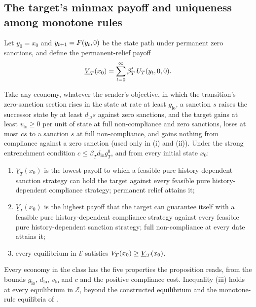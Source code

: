 \subsection{The target's minmax payoff and uniqueness among monotone rules}
\label{sec:moved-main-2026-10-13:security}

 Let $y_0=x_0$ and
$y_{t+1}=F(y_t,0)$ be the state path under permanent zero sanctions, and define
the permanent-relief payoff
\begin{equation}
\underline{V}_T(x_0)=\sum_{t=0}^{\infty}\beta_T^t\,U_T(y_t,0,0).
\label{eq:relief-benchmark}
\end{equation}

\begin{proposition}
\label{prop:security}
Take any economy, whatever the sender's objective, in which the transition's
zero-sanction section rises in the state at rate at least $g_{\mathrm{lo}}$, a
sanction $s$ raises the successor state by at least $d_{\mathrm{lo}}s$ against
zero sanctions, and the target gains at least $v_{\mathrm{lo}}\ge0$ per unit of
state at full non-compliance and zero sanctions, loses at most $cs$ to a sanction $s$
at full non-compliance, and gains nothing from compliance against a zero sanction
(used only in (i) and (ii)). Under the strong entrenchment condition
$c\le\beta_Td_{\mathrm{lo}}g_T^0$, and from every initial state $x_0$:
\begin{enumerate}[label=(\roman*)]
\item $\underline{V}_T(x_0)$ is the lowest payoff to which a feasible pure
history-dependent sanction strategy can hold the target against every
feasible pure history-dependent compliance strategy; permanent relief attains it;
\item $\underline{V}_T(x_0)$ is the highest payoff that the target can guarantee
itself with a feasible pure history-dependent compliance strategy against every
feasible pure history-dependent sanction strategy; full non-compliance at every date
attains it;
\item every equilibrium in $\mathcal E$ satisfies $V_T(x_0)\ge \underline{V}_T(x_0)$.
\end{enumerate}
\end{proposition}

 Every economy in the
class has the five properties the proposition reads, from the bounds
$g_{\mathrm{lo}}$, $d_{\mathrm{lo}}$, $v_{\mathrm{lo}}$ and $c$ and the positive
compliance cost. Inequality (iii) holds at every equilibrium in $\mathcal E$,
beyond the constructed equilibrium and the monotone-rule equilibria of
.

